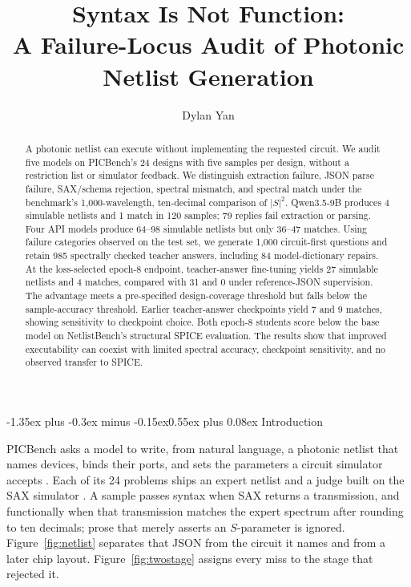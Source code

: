 \documentclass[11pt]{article}
\title{Syntax Is Not Function:\\
A Failure-Locus Audit of Photonic Netlist Generation}
\author{Dylan Yan}
\date{}
\makeatletter
\renewcommand\section{\@startsection{section}{1}{\z@}%
  {-1.35ex plus -0.3ex minus -0.15ex}{0.55ex plus 0.08ex}%
  {\normalfont\large\bfseries}}
\makeatother
\begin{document}
\maketitle

\begin{abstract}
A photonic netlist can execute without implementing the requested circuit. We audit five models on PICBench's 24 designs with five samples per design, without a restriction list or simulator feedback. We distinguish extraction failure, JSON parse failure, SAX/schema rejection, spectral mismatch, and spectral match under the benchmark's 1{,}000-wavelength, ten-decimal comparison of $|S|^2$. Qwen3.5-9B produces 4 simulable netlists and 1 match in 120 samples; 79 replies fail extraction or parsing. Four API models produce 64--98 simulable netlists but only 36--47 matches. Using failure categories observed on the test set, we generate 1{,}000 circuit-first questions and retain 985 spectrally checked teacher answers, including 84 model-dictionary repairs. At the loss-selected epoch-8 endpoint, teacher-answer fine-tuning yields 27 simulable netlists and 4 matches, compared with 31 and 0 under reference-JSON supervision. The advantage meets a pre-specified design-coverage threshold but falls below the sample-accuracy threshold. Earlier teacher-answer checkpoints yield 7 and 9 matches, showing sensitivity to checkpoint choice. Both epoch-8 students score below the base model on NetlistBench's structural SPICE evaluation. The results show that improved executability can coexist with limited spectral accuracy, checkpoint sensitivity, and no observed transfer to SPICE.
\end{abstract}

\section{Introduction}

PICBench asks a model to write, from natural language, a photonic netlist that names devices, binds their ports, and sets the parameters a circuit simulator accepts \citep{wu2025picbench}.
Each of its 24 problems ships an expert netlist and a judge built on the SAX simulator \citep{laporte2023sax}.
A sample passes syntax when SAX returns a transmission, and functionally when that transmission matches the expert spectrum after rounding to ten decimals; prose that merely asserts an $S$-parameter is ignored.
Figure~\ref{fig:netlist} separates that JSON from the circuit it names and from a later chip layout.
Figure~\ref{fig:twostage} assigns every miss to the stage that rejected it.
\end{document}
